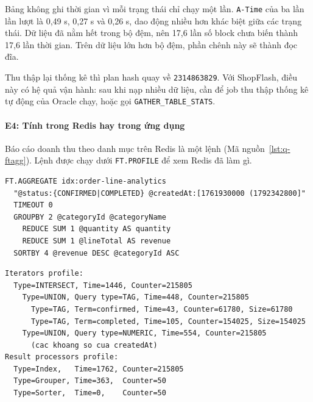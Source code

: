 Bảng không ghi thời gian vì mỗi trạng thái chỉ chạy một lần. \texttt{A-Time} của ba lần lần lượt là 0,49 s, 0,27 s và 0,26 s, dao động nhiều hơn khác biệt giữa các trạng thái. Dữ liệu đã nằm hết trong bộ đệm, nên 17,6 lần số block chưa biến thành 17,6 lần thời gian. Trên dữ liệu lớn hơn bộ đệm, phần chênh này sẽ thành đọc đĩa.

Thu thập lại thống kê thì plan hash quay về \texttt{2314863829}. Với ShopFlash, điều này có hệ quả vận hành: sau khi nạp nhiều dữ liệu, cần để job thu thập thống kê tự động của Oracle chạy, hoặc gọi \texttt{GATHER\_TABLE\_STATS}.

\paragraph{E4: Tính trong Redis hay trong ứng dụng}\label{sec:q-e4}

Báo cáo doanh thu theo danh mục trên Redis là một lệnh (Mã nguồn~\ref{lst:q-ftagg}). Lệnh được chạy dưới \texttt{FT.PROFILE} để xem Redis đã làm gì.

\reportblockspace{72pt}
\begin{lstlisting}[language=Redis,caption={Báo cáo doanh thu theo danh mục trên Redis.},label={lst:q-ftagg}]
FT.AGGREGATE idx:order-line-analytics
  "@status:{CONFIRMED|COMPLETED} @createdAt:[1761930000 (1792342800]"
  TIMEOUT 0
  GROUPBY 2 @categoryId @categoryName
    REDUCE SUM 1 @quantity AS quantity
    REDUCE SUM 1 @lineTotal AS revenue
  SORTBY 4 @revenue DESC @categoryId ASC
\end{lstlisting}

\reportblockspace{72pt}
\begingroup
{}\label{result:q-profile}
\nopagebreak[4]
\begin{Verbatim}[fontsize=\scriptsize]
Iterators profile:
  Type=INTERSECT, Time=1446, Counter=215805
    Type=UNION, Query type=TAG, Time=448, Counter=215805
      Type=TAG, Term=confirmed, Time=43, Counter=61780, Size=61780
      Type=TAG, Term=completed, Time=105, Counter=154025, Size=154025
    Type=UNION, Query type=NUMERIC, Time=554, Counter=215805
      (cac khoang so cua createdAt)
Result processors profile:
  Type=Index,   Time=1762, Counter=215805
  Type=Grouper, Time=363,  Counter=50
  Type=Sorter,  Time=0,    Counter=50
\end{Verbatim}
\endgroup\par\smallskip

